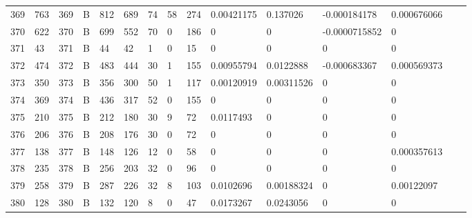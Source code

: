 \begin{longtable}{lllllllllllllll}
	369 & 763               & 369 & B   & 812               & 689               & 74                & 58   & 274        & 0.00421175     & 0.137026       & -0.000184178  & 0.000676066  \\
	370 & 622               & 370 & B   & 699               & 552               & 70                & 0    & 186        & 0              & 0              & -0.0000715852 & 0            \\
	371 & 43                & 371 & B   & 44                & 42                & 1                 & 0    & 15         & 0              & 0              & 0             & 0            \\
	372 & 474               & 372 & B   & 483               & 444               & 30                & 1    & 155        & 0.00955794     & 0.0122888      & -0.000683367  & 0.000569373  \\
	373 & 350               & 373 & B   & 356               & 300               & 50                & 1    & 117        & 0.00120919     & 0.00311526     & 0             & 0            \\
	374 & 369               & 374 & B   & 436               & 317               & 52                & 0    & 155        & 0              & 0              & 0             & 0            \\
	375 & 210               & 375 & B   & 212               & 180               & 30                & 9    & 72         & 0.0117493      & 0              & 0             & 0            \\
	376 & 206               & 376 & B   & 208               & 176               & 30                & 0    & 72         & 0              & 0              & 0             & 0            \\
	377 & 138               & 377 & B   & 148               & 126               & 12                & 0    & 58         & 0              & 0              & 0             & 0.000357613  \\
	378 & 235               & 378 & B   & 256               & 203               & 32                & 0    & 96         & 0              & 0              & 0             & 0            \\
	379 & 258               & 379 & B   & 287               & 226               & 32                & 8    & 103        & 0.0102696      & 0.00188324     & 0             & 0.00122097   \\
	380 & 128               & 380 & B   & 132               & 120               & 8                 & 0    & 47         & 0.0173267      & 0.0243056      & 0             & 0            \\

\end{longtable}
